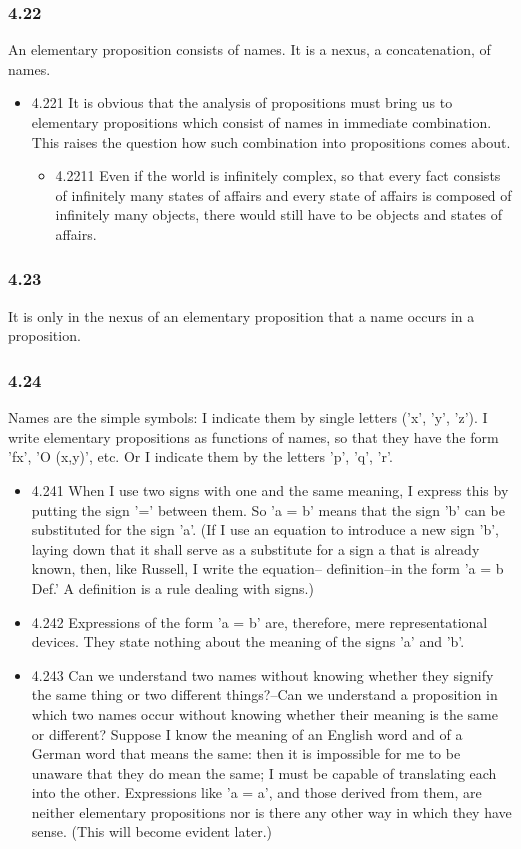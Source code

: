 \documentclass[11pt]{article}
\begin{document}
\subsubsection*{4.22}
\label{sec:org4c91fcc}
An elementary proposition consists of names. It is a nexus, a
concatenation, of names.
\begin{itemize}
\item 4.221
\label{sec:org17f520a}
It is obvious that the analysis of propositions must bring us to
elementary propositions which consist of names in immediate combination.
This raises the question how such combination into propositions comes
about.
\begin{itemize}
\item 4.2211
\label{sec:orgb5cba1f}
Even if the world is infinitely complex, so that every fact consists
of infinitely many states of affairs and every state of affairs is composed
of infinitely many objects, there would still have to be objects and states
of affairs.
\end{itemize}
\end{itemize}
\subsubsection*{4.23}
\label{sec:org7f66eed}
It is only in the nexus of an elementary proposition that a name
occurs in a proposition.
\subsubsection*{4.24}
\label{sec:org33edf41}
Names are the simple symbols: I indicate them by single letters ('x',
'y', 'z'). I write elementary propositions as functions of names, so that
they have the form 'fx', 'O (x,y)', etc. Or I indicate them by the letters
'p', 'q', 'r'.
\begin{itemize}
\item 4.241
\label{sec:org0f3b9f8}
When I use two signs with one and the same meaning, I express this by
putting the sign '=' between them. So 'a = b' means that the sign 'b' can
be substituted for the sign 'a'. (If I use an equation to introduce a new
sign 'b', laying down that it shall serve as a substitute for a sign a that
is already known, then, like Russell, I write the equation-- definition--in
the form 'a = b Def.' A definition is a rule dealing with signs.)
\item 4.242
\label{sec:orgdf35666}
Expressions of the form 'a = b' are, therefore, mere representational
devices. They state nothing about the meaning of the signs 'a' and 'b'.
\item 4.243
\label{sec:org46fd6d7}
Can we understand two names without knowing whether they signify the
same thing or two different things?--Can we understand a proposition in
which two names occur without knowing whether their meaning is the same or
different? Suppose I know the meaning of an English word and of a German
word that means the same: then it is impossible for me to be unaware that
they do mean the same; I must be capable of translating each into the
other. Expressions like 'a = a', and those derived from them, are neither
elementary propositions nor is there any other way in which they have
sense. (This will become evident later.)
\end{itemize}
\end{document}
